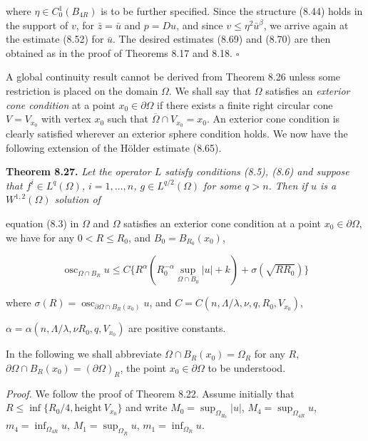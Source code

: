 where $\eta \in C^1_0(B_{4R})$ is to be further specified. Since the structure (8.44) holds in the
support of $v$, for $\bar{z}=\bar{u}$ and $p=Du$, and since $v \le \eta^2\bar{u}^{\beta}$, we arrive again at the estimate
(8.52) for $\bar{u}$. The desired estimates (8.69) and (8.70) are then obtained as in the
proof of Theorems 8.17 and 8.18. \(\square\)

A global continuity result cannot be derived from Theorem 8.26 unless some
restriction is placed on the domain $\Omega$. We shall say that $\Omega$ satisfies an \textit{exterior cone
condition} at a point $x_0 \in \partial\Omega$ if there exists a finite right circular cone $V = V_{x_0}$ with
vertex $x_0$ such that $\overline{\Omega} \cap V_{x_0} = x_0$. An exterior cone condition is clearly satisfied
wherever an exterior sphere condition holds. We now have the following extension
of the Hölder estimate (8.65).

\textbf{Theorem 8.27.} \textit{Let the operator $L$ satisfy conditions (8.5), (8.6) and suppose that
$f^i \in L^q(\Omega)$, $i=1,\ldots,n$, $g \in L^{q/2}(\Omega)$ for some $q>n$. Then if $u$ is a $W^{1,2}(\Omega)$ solution of}


\providecommand{\osc}{\operatorname{osc}}
\providecommand{\diam}{\operatorname{diam}}
equation (8.3) in $\Omega$ and $\Omega$ satisfies an exterior cone condition at a point $x_0 \in \partial\Omega$, we have for any $0 < R \le R_0$, and $B_0 = B_{R_0}(x_0)$,

\begin{equation*}
\tag{8.72}
\osc_{\Omega \cap B_R} u \le C\{R^\alpha(R_0^{-\alpha}\sup_{\Omega \cap B_0}|u| + k) + \sigma(\sqrt{RR_0})\}
\end{equation*}

where $\sigma(R) = \osc_{\partial\Omega \cap B_R(x_0)} u$, and $C = C(n,\Lambda/\lambda,\nu,q,R_0,V_{x_0})$,

$\alpha = \alpha(n,\Lambda/\lambda,\nu R_0,q,V_{x_0})$ are positive constants.

In the following we shall abbreviate $\Omega \cap B_R(x_0) = \Omega_R$ for any $R$, $\partial\Omega \cap B_R(x_0) = (\partial\Omega)_R$, the point $x_0 \in \partial\Omega$ to be understood.

\textit{Proof.} We follow the proof of Theorem 8.22. Assume initially that $R \le \inf\{R_0/4,\mathrm{height}\ V_{x_0}\}$ and write $M_0 = \sup_{\Omega_{R_0}}|u|$, $M_4 = \sup_{\Omega_{4R}} u$, $m_4 = \inf_{\Omega_{4R}} u$, $M_1 = \sup_{\Omega_R} u$, $m_1 = \inf_{\Omega_R} u$.

